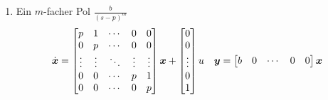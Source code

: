 \begin{enumerate}
	\item Ein $m$-facher Pol $\frac{b}{(s-p)^m}$
	\begin{align*}
		\dot{\boldsymbol{x}} = \begin{bmatrix}
			p&1&\cdots&0&0\\
			0&p&\cdots&0&0\\
			\vdots&\vdots&\ddots&\vdots&\vdots\\
			0&0&\cdots&p&1\\
			0&0&\cdots&0&p
		\end{bmatrix}\boldsymbol{x} + \begin{bmatrix}
		0\\0\\\vdots\\0\\1
		\end{bmatrix} u &&\boldsymbol{y} = \begin{bmatrix}
		b&0&\cdots&0&0
		\end{bmatrix}\boldsymbol{x}
	\end{align*}
	
\end{enumerate}
